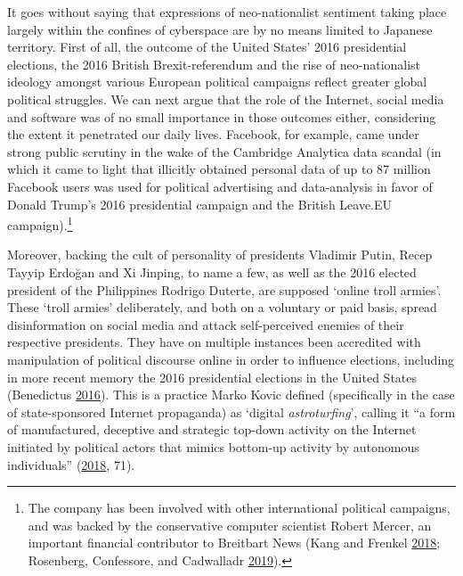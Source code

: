 \documentclass[10pt,british,A4paper,oneside]{memoir}
\begin{document}
It goes without saying that expressions of neo-nationalist sentiment
taking place largely within the confines of cyberspace are by no means
limited to Japanese territory. First of all, the outcome of the United
States' 2016 presidential elections, the 2016 British Brexit-referendum
and the rise of neo-nationalist ideology amongst various European
political campaigns reflect greater global political struggles. We can
next argue that the role of the Internet, social media and software was
of no small importance in those outcomes either, considering the extent
it penetrated our daily lives. Facebook, for example, came under strong
public scrutiny in the wake of the Cambridge Analytica data scandal (in
which it came to light that illicitly obtained personal data of up to 87
million Facebook users was used for political advertising and
data-analysis in favor of Donald Trump's 2016 presidential campaign and
the British Leave.EU campaign).\footnote{The company has been involved
  with other international political campaigns, and was backed by the
  conservative computer scientist Robert Mercer, an important financial
  contributor to Breitbart News (Kang and Frenkel
  \protect\hyperlink{ref-kang_facebook_2018}{2018}; Rosenberg,
  Confessore, and Cadwalladr
  \protect\hyperlink{ref-rosenberg_how_2019}{2019}).}

Moreover, backing the cult of personality of presidents Vladimir Putin,
Recep Tayyip Erdoğan and Xi Jinping, to name a few, as well as the 2016
elected president of the Philippines Rodrigo Duterte, are supposed
`online troll armies'. These `troll armies' deliberately, and both on a
voluntary or paid basis, spread disinformation on social media and
attack self-perceived enemies of their respective presidents. They have
on multiple instances been accredited with manipulation of political
discourse online in order to influence elections, including in more
recent memory the 2016 presidential elections in the United States
(Benedictus \protect\hyperlink{ref-benedictus_invasion_2016}{2016}). This is a
practice Marko Kovic defined (specifically in the case of state-sponsored Internet
propaganda) as `digital \emph{astroturfing}', calling it ``a form of
manufactured, deceptive and strategic top-down activity on the Internet
initiated by political actors that mimics bottom-up activity by
autonomous individuals''
(\protect\hyperlink{ref-kovic_digital_2018}{2018}, 71).
\end{document}
